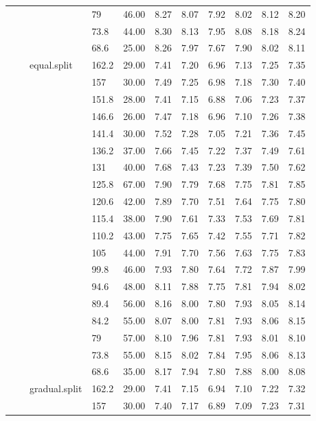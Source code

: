 \begin{longtable}{llllrrrrrrr}
   &  &  & 79 & 46.00 & 8.27 & 8.07 & 7.92 & 8.02 & 8.12 & 8.20 \\ 
   &  &  & 73.8 & 44.00 & 8.30 & 8.13 & 7.95 & 8.08 & 8.18 & 8.24 \\ 
   &  &  & 68.6 & 25.00 & 8.26 & 7.97 & 7.67 & 7.90 & 8.02 & 8.11 \\ 
   &  & equal.split & 162.2 & 29.00 & 7.41 & 7.20 & 6.96 & 7.13 & 7.25 & 7.35 \\ 
   &  &  & 157 & 30.00 & 7.49 & 7.25 & 6.98 & 7.18 & 7.30 & 7.40 \\ 
   &  &  & 151.8 & 28.00 & 7.41 & 7.15 & 6.88 & 7.06 & 7.23 & 7.37 \\ 
   &  &  & 146.6 & 26.00 & 7.47 & 7.18 & 6.96 & 7.10 & 7.26 & 7.38 \\ 
   &  &  & 141.4 & 30.00 & 7.52 & 7.28 & 7.05 & 7.21 & 7.36 & 7.45 \\ 
   &  &  & 136.2 & 37.00 & 7.66 & 7.45 & 7.22 & 7.37 & 7.49 & 7.61 \\ 
   &  &  & 131 & 40.00 & 7.68 & 7.43 & 7.23 & 7.39 & 7.50 & 7.62 \\ 
   &  &  & 125.8 & 67.00 & 7.90 & 7.79 & 7.68 & 7.75 & 7.81 & 7.85 \\ 
   &  &  & 120.6 & 42.00 & 7.89 & 7.70 & 7.51 & 7.64 & 7.75 & 7.80 \\ 
   &  &  & 115.4 & 38.00 & 7.90 & 7.61 & 7.33 & 7.53 & 7.69 & 7.81 \\ 
   &  &  & 110.2 & 43.00 & 7.75 & 7.65 & 7.42 & 7.55 & 7.71 & 7.82 \\ 
   &  &  & 105 & 44.00 & 7.91 & 7.70 & 7.56 & 7.63 & 7.75 & 7.83 \\ 
   &  &  & 99.8 & 46.00 & 7.93 & 7.80 & 7.64 & 7.72 & 7.87 & 7.99 \\ 
   &  &  & 94.6 & 48.00 & 8.11 & 7.88 & 7.75 & 7.81 & 7.94 & 8.02 \\ 
   &  &  & 89.4 & 56.00 & 8.16 & 8.00 & 7.80 & 7.93 & 8.05 & 8.14 \\ 
   &  &  & 84.2 & 55.00 & 8.07 & 8.00 & 7.81 & 7.93 & 8.06 & 8.15 \\ 
   &  &  & 79 & 57.00 & 8.10 & 7.96 & 7.81 & 7.93 & 8.01 & 8.10 \\ 
   &  &  & 73.8 & 55.00 & 8.15 & 8.02 & 7.84 & 7.95 & 8.06 & 8.13 \\ 
   &  &  & 68.6 & 35.00 & 8.17 & 7.94 & 7.80 & 7.88 & 8.00 & 8.08 \\ 
   &  & gradual.split & 162.2 & 29.00 & 7.41 & 7.15 & 6.94 & 7.10 & 7.22 & 7.32 \\ 
   &  &  & 157 & 30.00 & 7.40 & 7.17 & 6.89 & 7.09 & 7.23 & 7.31 \\ 

\end{longtable}
